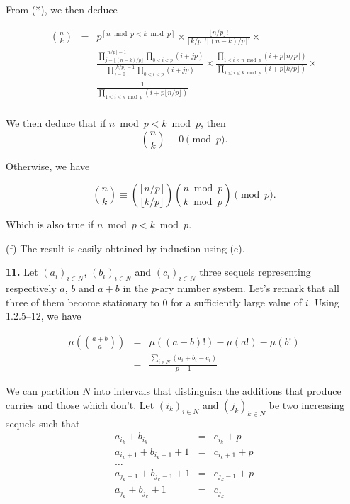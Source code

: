 \documentclass[a4paper,12pt]{article}
\newcommand{\newpar}[1]{\bigskip \noindent \textbf{#1.}}
\newcommand{\subpar}[1]{\medskip \noindent (#1)}
\begin{document}
From (*), we then deduce

\begin{eqnarray*}
  {n \choose k} &=& p^{[n\bmod p < k \bmod p]} \times \frac{\lfloor
    n/p\rfloor!}{\lfloor k/p\rfloor!\lfloor (n-k)/p\rfloor!} \times
  \\ &&
  \frac{\prod_{j=\lfloor (n-k)/p\rfloor}^{\lfloor
      n/p\rfloor-1}\prod_{0<i<p}(i+jp)} {\prod_{j=0}^{\lfloor
      k/p\rfloor-1}\prod_{0<i<p}(i+jp)} \times
  \frac{\prod_{1\le i\le n\bmod p} (i+p\lfloor
    n/p\rfloor)}{\prod_{1\le i\le k\bmod p} (i+p\lfloor k/p\rfloor)}
  \times \\ &&
  \frac{1}{\prod_{1\le i\le n\bmod p} (i+p\lfloor n/p\rfloor)}\\
\end{eqnarray*}

We then deduce that if $n \bmod p < k \bmod p$, then
\[ {n \choose k} \equiv 0 \pmod p.\]

Otherwise, we have

\[ {n \choose k} \equiv { \lfloor n/p\rfloor \choose \lfloor k/p
  \rfloor } {n \bmod p \choose k \bmod p} \pmod p.\]

Which is also true if $n \bmod p < k \bmod p$.

\subpar{f} The result is easily obtained by induction using (e).

\newpar{11} Let $(a_i)_{i \in N}$, $(b_i)_{i \in N}$ and $(c_i)_{i \in
  N}$ three sequels representing respectively  $a$, $b$ and $a+b$ in
the $p$-ary number system.  Let's remark that all three of them become
stationary to $0$ for a sufficiently large value of $i$. Using
1.2.5--12, we have

\begin{eqnarray*}
  \mu\left( {{a+b} \choose a} \right) &=& \mu((a+b)!) - \mu(a!) - \mu(b!) \\
  &=& \frac{\sum_{i \in N} (a_i + b_i - c_i)}{p-1}
\end{eqnarray*}

We can partition $N$ into intervals that distinguish the additions
that produce carries and those which don't.  Let $(i_k)_{i \in N}$ and
$(j_k)_{k \in N}$ be two increasing sequels such that
\begin{eqnarray*}
  a_{i_k} + b_{i_k} &=& c_{i_k} + p \\
  a_{i_k+1} + b_{i_k + 1} + 1 &=& c_{i_k + 1} + p \\
  \ldots \\
  a_{j_k - 1} + b_{j_k - 1} + 1 &=& c_{j_k - 1} + p \\
  a_{j_k} + b_{j_k} + 1 &=& c_{j_k}
\end{eqnarray*}
\end{document}
